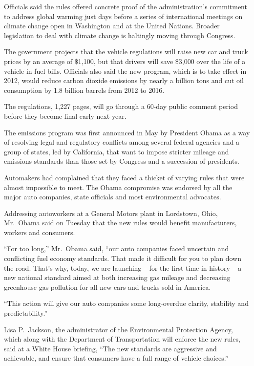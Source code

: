 ﻿\documentclass[12pt]{article}
\begin{document}
Officials said the rules offered concrete proof of the administration's commitment to address global
warming just days before a series of international meetings on climate change open in Washington and
at the United Nations. Broader legislation to deal with climate change is haltingly moving through
Congress.

The government projects that the vehicle regulations will raise new car and truck prices by an
average of \$1,100, but that drivers will save \$3,000 over the life of a vehicle in fuel bills.
Officials also said the new program, which is to take effect in 2012, would reduce carbon dioxide
emissions by nearly a billion tons and cut oil consumption by 1.8 billion barrels from 2012 to 2016.

The regulations, 1,227 pages, will go through a 60-day public comment period before they become
final early next year.

The emissions program was first announced in May by President Obama as a way of resolving legal and
regulatory conflicts among several federal agencies and a group of states, led by California, that
want to impose stricter mileage and emissions standards than those set by Congress and a succession
of presidents.

Automakers had complained that they faced a thicket of varying rules that were almost impossible to
meet. The Obama compromise was endorsed by all the major auto companies, state officials and most
environmental advocates.

Addressing autoworkers at a General Motors plant in Lordstown, Ohio, Mr.~Obama said on Tuesday that
the new rules would benefit manufacturers, workers and consumers.

``For too long,'' Mr.~Obama said, ``our auto companies faced uncertain and conflicting fuel economy
standards. That made it difficult for you to plan down the road. That's why, today, we are launching
-- for the first time in history -- a new national standard aimed at both increasing gas mileage and
decreasing greenhouse gas pollution for all new cars and trucks sold in America.

``This action will give our auto companies some long-overdue clarity, stability and
predictability.''

Lisa P.~Jackson, the administrator of the Environmental Protection Agency, which along with the
Department of Transportation will enforce the new rules, said at a White House briefing, ``The new
standards are aggressive and achievable, and ensure that consumers have a full range of vehicle
choices.''
\end{document}
